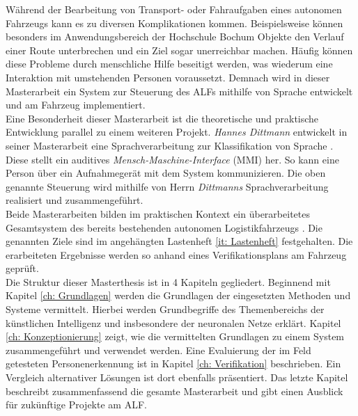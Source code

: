 		Während der Bearbeitung von Transport- oder Fahraufgaben eines autonomen Fahrzeugs kann es zu diversen Komplikationen kommen. Beispielsweise können besonders im Anwendungsbereich der Hochschule Bochum Objekte den Verlauf einer Route unterbrechen und ein Ziel sogar unerreichbar machen. Häufig können diese Probleme durch menschliche Hilfe beseitigt werden, was wiederum eine Interaktion mit umstehenden Personen voraussetzt. Demnach wird in dieser Masterarbeit ein System zur Steuerung des ALFs mithilfe von Sprache entwickelt und am Fahrzeug implementiert.\\
		
		Eine Besonderheit dieser Masterarbeit ist die theoretische und praktische Entwicklung parallel zu einem weiteren Projekt. \textit{Hannes Dittmann} entwickelt in seiner Masterarbeit eine Sprachverarbeitung zur Klassifikation von Sprache \cite{Dittmann}. Diese stellt ein auditives \textit{Mensch-Maschine-Interface} (MMI) her. So kann eine Person über ein Aufnahmegerät mit dem System kommunizieren. Die oben genannte Steuerung wird mithilfe von Herrn \textit{Dittmanns} Sprachverarbeitung realisiert und zusammengeführt.\\
		
		Beide Masterarbeiten bilden im praktischen Kontext ein überarbeitetes Gesamtsystem des bereits bestehenden autonomen Logistikfahrzeugs \cite{Dittmann}. Die genannten Ziele sind im angehängten Lastenheft \ref{it: Lastenheft} festgehalten. Die erarbeiteten Ergebnisse werden so anhand eines Verifikationsplans am Fahrzeug geprüft.\\
		
		Die Struktur dieser Masterthesis ist in 4 Kapiteln gegliedert. Beginnend mit Kapitel \ref{ch: Grundlagen} werden die Grundlagen der eingesetzten Methoden und Systeme vermittelt. Hierbei werden Grundbegriffe des Themenbereichs der künstlichen Intelligenz und insbesondere der neuronalen Netze erklärt. Kapitel \ref{ch: Konzeptionierung} zeigt, wie die vermittelten Grundlagen zu einem System zusammengeführt und verwendet werden. Eine Evaluierung der im Feld getesteten Personenerkennung ist in Kapitel \ref{ch: Verifikation} beschrieben. Ein Vergleich alternativer Lösungen ist dort ebenfalls präsentiert. Das letzte Kapitel beschreibt zusammenfassend die gesamte Masterarbeit und gibt einen Ausblick für zukünftige Projekte am ALF. \\
		
		
		
		
		
		
	